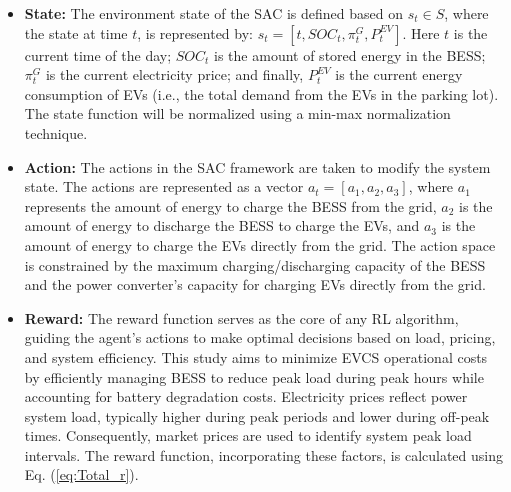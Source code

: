 \documentclass[10pt, journal]{IEEEtran}
\begin{document}
\begin{itemize}[leftmargin=3mm]
\vspace{-1mm}
    \item \textbf{State:} The environment state of the SAC is defined based on \( s_t \in S \), where the state at time \( t \), is represented by: \(s_t = [t,  SOC_t, \pi^G_t, P_t^{EV}] \). Here $t$ is the current time of the day; $SOC_t$ is the amount of stored energy in the BESS;  $\pi^G_t$ is the current electricity price; and finally, $ P_t^{EV}$ is the current energy consumption of EVs (i.e., the total demand from the EVs in the parking lot). The state function will be normalized using a min-max normalization technique.
    
    \item \textbf{Action:} The actions in the SAC framework are taken to modify the system state. The actions are represented as a vector \( a_t = [a_1, a_2, a_3] \), where \( a_1 \) represents the amount of energy to charge the BESS from the grid, \( a_2 \) is the amount of energy to discharge the BESS to charge the EVs, and \( a_3 \) is the amount of energy to charge the EVs directly from the grid. The action space is constrained by the maximum charging/discharging capacity of the BESS and the power converter's capacity for charging EVs directly from the grid.

    \item \textbf{Reward:} The reward function serves as the core of any RL algorithm, guiding the agent's actions to make optimal decisions based on load, pricing, and system efficiency. This study aims to minimize EVCS operational costs by efficiently managing BESS to reduce peak load during peak hours while accounting for battery degradation costs. Electricity prices reflect power system load, typically higher during peak periods and lower during off-peak times. Consequently, market prices are used to identify system peak load intervals. The reward function, incorporating these factors, is calculated using Eq. (\ref{eq:Total_r}).
\end{itemize}
\vspace{-2mm}
\end{document}
